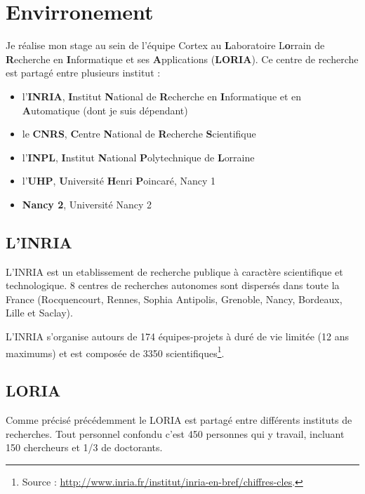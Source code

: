 \chapter{Envirronement} %
\label{cha:Envirronement}

Je réalise mon stage au sein de l'équipe Cortex au \textbf{L}aboratoire L\textbf{o}rrain de
\textbf{R}echerche en \textbf{I}nformatique et ses \textbf{A}pplications (\textbf{LORIA}).
Ce centre de recherche est partagé entre plusieurs institut :
\begin{itemize}
   \item l'\textbf{INRIA}, \textbf{I}nstitut \textbf{N}ational de \textbf{R}echerche en \textbf{I}nformatique
      et en \textbf{A}utomatique (dont je suis dépendant)
   \item le \textbf{CNRS}, \textbf{C}entre \textbf{N}ational de \textbf{R}echerche \textbf{S}cientifique
   \item l'\textbf{INPL}, \textbf{I}nstitut \textbf{N}ational \textbf{P}olytechnique de \textbf{L}orraine
   \item l'\textbf{UHP}, \textbf{U}niversité \textbf{H}enri \textbf{P}oincaré, Nancy 1
   \item \textbf{Nancy 2}, Université Nancy 2
\end{itemize}

\section{L'INRIA} %
\label{sec:L'INRIA}

L'INRIA est un etablissement de recherche publique à caractère scientifique et technologique. 8 centres de
recherches autonomes sont dispersés dans toute la France (Rocquencourt, Rennes, Sophia Antipolis, Grenoble,
Nancy, Bordeaux, Lille et Saclay).

L'INRIA s'organise autours de 174 équipes-projets à duré de vie limitée (12 ans maximums) et est composée
de 3350 scientifiques\footnote{Source : \url{http://www.inria.fr/institut/inria-en-bref/chiffres-cles}.}.


\section{LORIA} %
\label{sec:LORIA}

Comme précisé précédemment le LORIA est partagé entre différents instituts de recherches. Tout personnel confondu
c'est 450 personnes qui y travail, incluant 150 chercheurs et 1/3 de doctorants.

